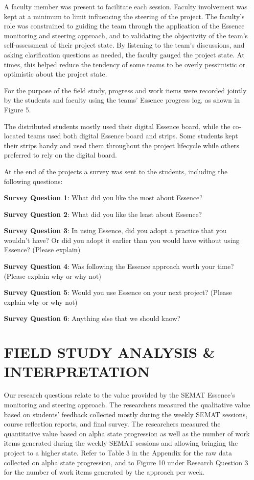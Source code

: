 A faculty member was present to facilitate each session. Faculty involvement was kept at a minimum to limit influencing the steering of the project. The faculty's role was constrained to guiding the team through the application of the Essence monitoring and steering approach, and to validating the objectivity of the team's self-assessment of their project state. By listening to the team's discussions, and asking clarification questions as needed, the faculty gauged the project state. At times, this helped reduce the tendency of some teams to be overly pessimistic or optimistic about the project state.

For the purpose of the field study, progress and work items were recorded jointly by the students and faculty using the teams' Essence progress log, as shown in Figure 5.

The distributed students mostly used their digital Essence board, while the co-located teams used both digital Essence board and strips. Some students kept their strips handy and used them throughout the project lifecycle while others preferred to rely on the digital board.

At the end of the projects a survey was sent to the students, including the following questions:

\textbf{Survey Question 1}: What did you like the most about Essence? 

\textbf{Survey Question 2}: What did you like the least about Essence? 

\textbf{Survey Question 3}: In using Essence, did you adopt a practice that you wouldn't have? Or did you adopt it earlier than you would have without using Essence? (Please explain)

\textbf{Survey Question 4}: Was following the Essence approach worth your time? (Please explain why or why not)

\textbf{Survey Question 5}: Would you use Essence on your next project? (Please explain why or why not)

\textbf{Survey Question 6}: Anything else that we should know?

\section{FIELD STUDY ANALYSIS \& INTERPRETATION}
Our research questions relate to the value provided by the SEMAT Essence's monitoring and steering approach. The researchers measured the qualitative value based on students' feedback collected mostly during the weekly SEMAT sessions, course reflection reports, and final survey. The researchers measured the quantitative value based on alpha state progression as well as the number of work items generated during the weekly SEMAT sessions and allowing bringing the project to a higher state. Refer to Table 3 in the Appendix for the raw data collected on alpha state progression, and to Figure 10 under Research Question 3 for the number of work items generated by the approach per week.


